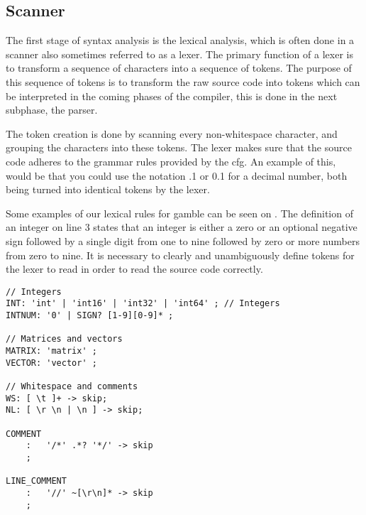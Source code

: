 \subsection*{Scanner}
The first stage of syntax analysis is the lexical analysis, which is often done in a scanner also sometimes referred to as a lexer.
The primary function of a lexer is to transform a sequence of characters into a sequence of tokens.
The purpose of this sequence of tokens is to transform the raw source code into tokens which can be interpreted in the coming phases of the compiler, this is done in the next subphase, the parser.
  
The token creation is done by scanning every non-whitespace character, and grouping the characters into these tokens.
The lexer makes sure that the source code adheres to the grammar rules provided by the \acrshort{cfg}.
An example of this, would be that you could use the notation .1 or 0.1 for a decimal number, both being turned into identical tokens by the lexer.

Some examples of our lexical rules for \gls{gamble} can be seen on .
The definition of an integer on line 3 states that an integer is either a zero or an optional negative sign followed by a single digit from one to nine followed by zero or more numbers from zero to nine.
It is necessary to clearly and unambiguously define tokens for the lexer to read in order to read the source code correctly. \citep{Crafting_book}

\begin{lstlisting}[caption=Example of our lexer rules for \gls{gamble},frame=tlrb,label={lst:token}]
// Integers
INT: 'int' | 'int16' | 'int32' | 'int64' ; // Integers
INTNUM: '0' | SIGN? [1-9][0-9]* ;

// Matrices and vectors
MATRIX: 'matrix' ;
VECTOR: 'vector' ;

// Whitespace and comments
WS: [ \t ]+ -> skip;
NL: [ \r \n | \n ] -> skip;

COMMENT
    :   '/*' .*? '*/' -> skip
    ;

LINE_COMMENT
    :   '//' ~[\r\n]* -> skip
    ;
\end{lstlisting} 